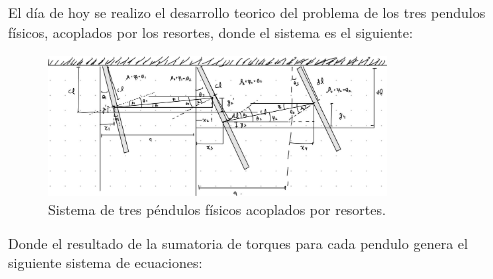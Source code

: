 \documentclass[fontsize=11pt,
  paper=a4paper,
  twoside,
  captions=tableheading,
  index=totoc,
  hyperref]{labbook}
\begin{document}

\title{\fontsize{40pt}{40pt}}

\author{
   \and {}
  \and {}
}
\date{}

\maketitle

\printindex
\tableofcontents
\newpage

\begin{addmargin}[4cm]{0cm}

\pagestyle{scrheadings}





El día de hoy se realizo el desarrollo teorico del problema de los tres pendulos físicos, acoplados por los resortes, donde el sistema es el siguiente:
\begin{figure}[h!]

 
  \includegraphics[width=0.8\textwidth]{Figures/IM1.jpeg}

  \caption{Sistema de tres péndulos físicos acoplados por resortes.}
  \label{fig:sistema_pendulos}
\end{figure}
Donde el resultado de la sumatoria de torques para cada pendulo genera el siguiente sistema de ecuaciones:


\end{addmargin}
\end{document}
